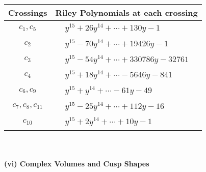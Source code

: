 \documentclass[1p]{elsarticle_modified}
\theoremstyle{definition}
\begin{document}
\begin{tabular}{m{50pt}|m{274pt}}
Crossings & \hspace{64pt}Riley Polynomials at each crossing \\
\hline $$\begin{aligned}c_{1},c_{5}\end{aligned}$$&$\begin{aligned}
&y^{15}+26 y^{14}+\cdots+130 y-1
\end{aligned}$\\
\hline $$\begin{aligned}c_{2}\end{aligned}$$&$\begin{aligned}
&y^{15}-70 y^{14}+\cdots+19426 y-1
\end{aligned}$\\
\hline $$\begin{aligned}c_{3}\end{aligned}$$&$\begin{aligned}
&y^{15}-54 y^{14}+\cdots+330786 y-32761
\end{aligned}$\\
\hline $$\begin{aligned}c_{4}\end{aligned}$$&$\begin{aligned}
&y^{15}+18 y^{14}+\cdots-5646 y-841
\end{aligned}$\\
\hline $$\begin{aligned}c_{6},c_{9}\end{aligned}$$&$\begin{aligned}
&y^{15}+y^{14}+\cdots-61 y-49
\end{aligned}$\\
\hline $$\begin{aligned}c_{7},c_{8},c_{11}\end{aligned}$$&$\begin{aligned}
&y^{15}-25 y^{14}+\cdots+112 y-16
\end{aligned}$\\
\hline $$\begin{aligned}c_{10}\end{aligned}$$&$\begin{aligned}
&y^{15}+2 y^{14}+\cdots+10 y-1
\end{aligned}$\\
\hline
\end{tabular}\\~\\
\newpage\flushleft \textbf{(vi) Complex Volumes and Cusp Shapes}
\end{document}
